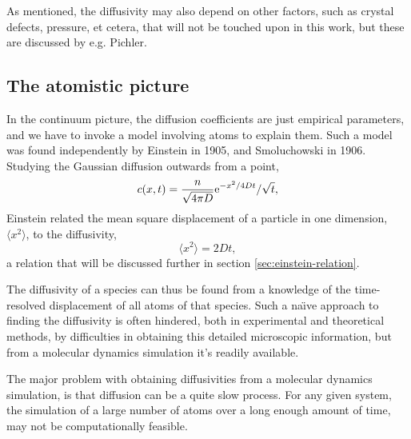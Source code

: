 \documentclass[11pt,bibliography=totoc,index=totoc]{scrbook}   %
\begin{document}
As mentioned, the diffusivity may also depend on other factors, such as crystal defects, pressure, et cetera, that will not be touched upon in this work, but these are discussed by e.g. Pichler.\cite{Pichler:2004}

%
\subsection{The atomistic picture}\label{sec:AtomisticPicture}
%

In the continuum picture, the diffusion coefficients are just empirical parameters, and we have to invoke a model involving atoms to explain them. 
Such a model was found independently by Einstein in 1905,\cite{Einstein:1905} and Smoluchowski in 1906.\cite{Smoluchowski:1906}
Studying the Gaussian diffusion outwards from a point,
\begin{equation}
    c(x,t) = \frac{n}{\sqrt{4\pi D}} \mathrm{e}^{-x^2/4Dt} / \sqrt{t},
\end{equation}
Einstein related the mean square displacement of a particle in one dimension, $\langle x^2 \rangle$, to the diffusivity\cite{Einstein:1905},
\begin{equation}
    \langle x^2\rangle = 2Dt,
    \label{eq:einsteinRelationSimple}
\end{equation}
a relation that will be discussed further in section \ref{sec:einstein-relation}.

The diffusivity of a species can thus be found from a knowledge of the time-resolved displacement of all atoms of that species.
Such a na\"{\i}ve approach to finding the diffusivity is often hindered, both in experimental and theoretical methods, 
by difficulties in obtaining this detailed microscopic information, but from a molecular dynamics simulation it's readily available.

The major problem with obtaining diffusivities from a molecular dynamics simulation, is that diffusion can be a quite slow process.
For any given system, the simulation of a large number of atoms over a long enough amount of time, may not be computationally feasible.

\end{document}
